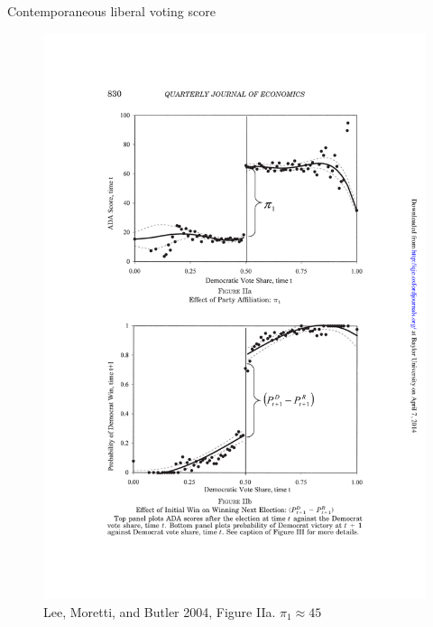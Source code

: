 \documentclass{beamer}
\begin{document}
\clearpage
\newpage

\begin{frame}{Contemporaneous liberal voting score}
	
	\begin{figure}
	\includegraphics[scale=0.75]{./lecture_includes/lee_fig2.pdf}
	\caption{Lee, Moretti, and Butler 2004, Figure IIa. $\pi_1\approx 45$}
	\end{figure}
\end{frame}
\end{document}
